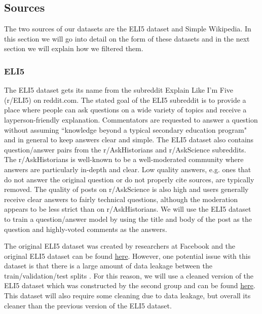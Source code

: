 \documentclass[11pt, oneside]{article}   	%
\begin{document}
\subsection{Sources}
The two sources of our datasets are the ELI5 dataset and Simple Wikipedia.
In this section we will go into detail on the form of these datasets and in the next section we will explain how we filtered them. 

\subsubsection*{ELI5}

The ELI5 dataset gets its name from the subreddit Explain Like I'm Five (r/ELI5) on reddit.com.
The stated goal of the ELI5 subreddit is to provide a place where people can ask questions on a wide variety of topics and receive a layperson-friendly explanation.
Commentators are requested to answer a question without assuming ``knowledge beyond a typical secondary education program" and in general to keep answers clear and simple.
The ELI5 dataset also contains question/answer pairs from the r/AskHistorians and r/AskScience subreddits. The r/AskHistorians is well-known to be a well-moderated community where answers are particularly in-depth and clear. 
Low quality answers, e.g. ones that do not answer the original question or do not properly cite sources, are typically removed.
The quality of posts on r/AskScience is also high and users generally receive clear answers to fairly technical questions, although the moderation appears to be less strict than on r/AskHistorians.
We will use the ELI5 dataset to train a question/answer model by using the title and body of the post as the question and highly-voted comments as the answers.

The original ELI5 dataset was created by researchers at Facebook \cite{fan-etal-2019-ELI5} and the original ELI5 dataset can be found \href{https://huggingface.co/datasets/ELI5}{here}.
However, one potential issue with this dataset is that there is a large amount of data leakage between the train/validation/test splits \cite{krishna2021hurdles,mahapatra2021new}.
For this reason, we will use a cleaned version of the ELI5 dataset which was constructed by the second group and can be found \href{https://huggingface.co/datasets/vblagoje/lfqa}{here}.
This dataset will also require some cleaning due to data leakage, but overall its cleaner than the previous version of the ELI5 dataset.
\end{document}
